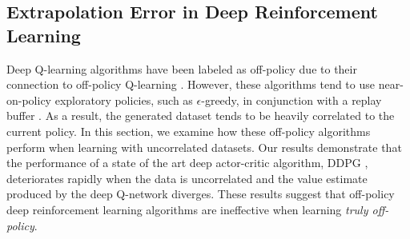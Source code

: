 \documentclass{article}
\newcommand{\e}{\epsilon}
\newcommand{\y}{\gamma}
\begin{document}


\subsection{Extrapolation Error in Deep Reinforcement Learning} \label{sec:drl_extrapolation}

Deep Q-learning algorithms \cite{DQN} have been labeled as off-policy due to their connection to off-policy Q-learning \cite{watkins1989qlearning}. However, these algorithms tend to use near-on-policy exploratory policies, such as $\e$-greedy, in conjunction with a replay buffer \cite{expreplay1992}. As a result, the generated dataset tends to be heavily correlated to the current policy. In this section, we examine how these off-policy algorithms perform when learning with uncorrelated datasets. Our results demonstrate that the performance of a state of the art deep actor-critic algorithm, DDPG \cite{DDPG}, deteriorates rapidly when the data is uncorrelated and the value estimate produced by the deep Q-network diverges. These results suggest that off-policy deep reinforcement learning algorithms are ineffective when learning \textit{truly off-policy}. 
\end{document}
